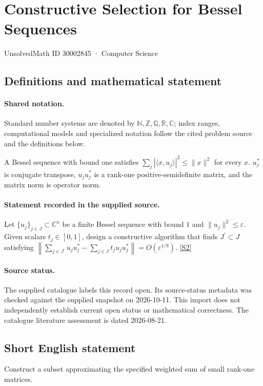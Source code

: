 \documentclass[11pt]{article}
\newcommand{\sref}[2]{\hyperlink{source:#1:#2}{[S#2]}}
\begin{document}
\setcounter{section}{30002844}
\section{Constructive Selection for Bessel Sequences}\label{30002845}
{\small\sffamily UnsolvedMath ID 30002845 · Computer Science}
\subsection{Definitions and mathematical statement}

\paragraph{Shared notation.}Standard number systems are denoted by $\mathbb N,\mathbb Z,\mathbb Q,\mathbb R,\mathbb C$; index ranges, computational models and specialized notation follow the cited problem source and the definitions below.


A Bessel sequence with bound one satisfies $\sum_j|\langle x,u_j\rangle|^2\leq\lVert x\rVert^2$ for every $x$. $u_j^*$ is conjugate transpose, $u_ju_j^*$ is a rank-one positive-semidefinite matrix, and the matrix norm is operator norm.
\paragraph{Statement recorded in the supplied source.}
Let $\{u_j\}_{j\in J}\subset\mathbb{C}^n$ be a finite Bessel sequence with bound $1$ and $\lVert u_j\rVert^2\leq\varepsilon$. Given scalars $t_j\in[0,1]$, design a constructive algorithm that finds $J^\prime\subset J$ satisfying $\left\lVert\sum_{j\in J^\prime}u_ju_j^*-\sum_{j\in J}t_ju_ju_j^*\right\rVert=O(\varepsilon^{1/8})$. \sref{30002845}{2}
\paragraph{Source status.}
The supplied catalogue labels this record open. Its source-status metadata was checked against the supplied snapshot on 2026-10-11. This import does not independently establish current open status or mathematical correctness. The catalogue literature assessment is dated 2026-08-21.
\subsection{Short English statement}
Construct a subset approximating the specified weighted sum of small rank-one matrices.
\end{document}
